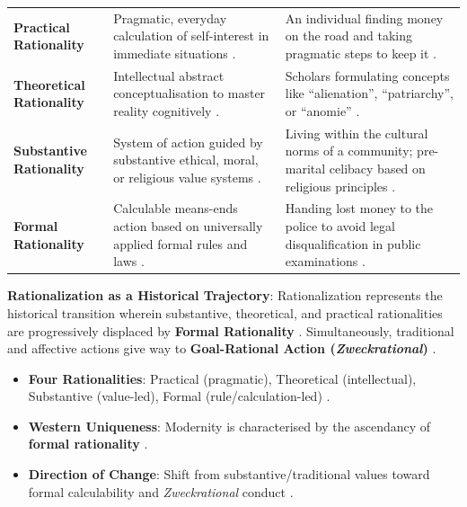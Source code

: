 \begin{table}[htbp]
\centering
\begin{tabularx}{\textwidth}{p{3.5cm} Y Y}
\hline
{}
 &  &  \\
\hline
\textbf{Practical Rationality} & Pragmatic, everyday calculation of self-interest in immediate situations . & An individual finding money on the road and taking pragmatic steps to keep it . \\
\textbf{Theoretical Rationality} & Intellectual abstract conceptualisation to master reality cognitively . & Scholars formulating concepts like ``alienation'', ``patriarchy'', or ``anomie'' . \\
\textbf{Substantive Rationality} & System of action guided by substantive ethical, moral, or religious value systems . & Living within the cultural norms of a community; pre-marital celibacy based on religious principles . \\
\textbf{Formal Rationality} & Calculable means-ends action based on universally applied formal rules and laws . & Handing lost money to the police to avoid legal disqualification in public examinations . \\
\hline
\end{tabularx}
\end{table}

\begin{KeyConcept}
\textbf{Rationalization as a Historical Trajectory}:
Rationalization represents the historical transition wherein substantive, theoretical, and practical rationalities are progressively displaced by \textbf{Formal Rationality} . Simultaneously, traditional and affective actions give way to \textbf{Goal-Rational Action (\textit{Zweckrational})} .
\end{KeyConcept}

\begin{QuickRevision}
\begin{itemize}
    \item \textbf{Four Rationalities}: Practical (pragmatic), Theoretical (intellectual), Substantive (value-led), Formal (rule/calculation-led) .
    \item \textbf{Western Uniqueness}: Modernity is characterised by the ascendancy of \textbf{formal rationality} .
    \item \textbf{Direction of Change}: Shift from substantive/traditional values toward formal calculability and \textit{Zweckrational} conduct .
\end{itemize}
\end{QuickRevision}

